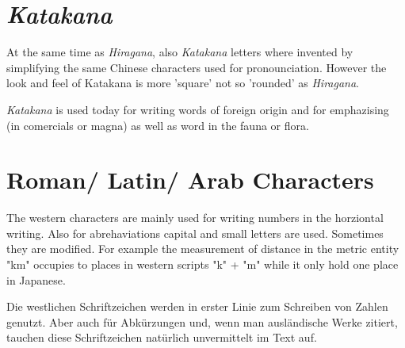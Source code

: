 \section*{\textit{Katakana}}

At the same time as \textit{Hiragana}, also  \textit{Katakana} letters where
invented by simplifying the same Chinese characters used for pronounciation.
However the look and feel of Katakana is more 'square' not so 'rounded' as
\textit{Hiragana}.

\textit{Katakana} is used today for writing words of foreign origin and for
emphazising (in comercials or magna) as well as word in the fauna or flora. 

\section*{Roman/ Latin/ Arab Characters}

The western characters are mainly used for writing numbers in the horziontal
writing. Also for abrehaviations capital and small letters are used. Sometimes
they are modified. For example the measurement of distance in the metric entity
"km" occupies to places in western scripts "k" + "m" while it only hold
one place in Japanese.

Die westlichen Schriftzeichen werden in erster Linie zum Schreiben 
von Zahlen genutzt. Aber auch f\"ur Abk\"urzungen und, wenn man 
ausl\"andische Werke zitiert, tauchen diese Schriftzeichen 
nat\"urlich unvermittelt im Text auf.

